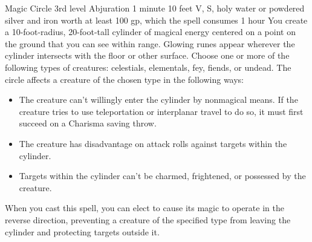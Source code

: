 \documentclass[10pt,a4paper,twoside,bg=print,twocolumn,openany,nodeprecatedcode]{dndbook}
\begin{document}
\DndSpellHeader%
{Magic Circle}
{3rd level Abjuration}
{1 minute}
{10 feet}
{V, S, holy water or powdered silver and iron worth at least 100 gp, which the spell consumes}
{1 hour}
You create a 10-foot-radius, 20-foot-tall cylinder of magical energy centered on a point on the ground that you can see within range. Glowing runes appear wherever the cylinder intersects with the floor or other surface.
Choose one or more of the following types of creatures: celestials, elementals, fey, fiends, or undead. The circle affects a creature of the chosen type in the following ways:

\begin{itemize}
\item The creature can't willingly enter the cylinder by nonmagical means. If the creature tries to use teleportation or interplanar travel to do so, it must first succeed on a Charisma saving throw.
\item The creature has disadvantage on attack rolls against targets within the cylinder.
\item Targets within the cylinder can't be charmed, frightened, or possessed by the creature.
\end{itemize}

When you cast this spell, you can elect to cause its magic to operate in the reverse direction, preventing a creature of the specified type from leaving the cylinder and protecting targets outside it.
\end{document}
